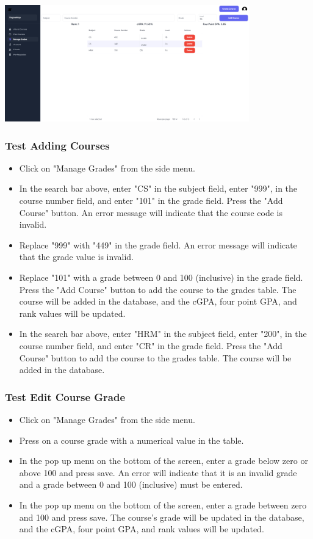 \documentclass[12pt, a4paper]{article}
\begin{document}
\begin{center}
    \includegraphics[width=400px]{R10/i5}
\end{center}

\subsubsection*{Test Adding Courses}
\begin{itemize}
\item Click on "Manage Grades" from the side menu.
\item In the search bar above, enter "CS" in the subject field, enter "999", in the course number field, and enter "101" in the grade field. Press the "Add Course" button. An error message will indicate that the course code is invalid. 
\item Replace "999" with "449" in the grade field. An error message will indicate that the grade value is invalid. 
\item Replace "101" with a grade between 0 and 100 (inclusive) in the grade field. Press the "Add Course" button to add the course to the grades table. The course will be added in the database, and the cGPA, four point GPA, and rank values will be updated.
\item In the search bar above, enter "HRM" in the subject field, enter "200", in the course number field, and enter "CR" in the grade field. Press the "Add Course" button to add the course to the grades table. The course will be added in the database.
\end{itemize}

\subsubsection*{Test Edit Course Grade}
\begin{itemize}
    \item Click on "Manage Grades" from the side menu.
    \item Press on a course grade with a numerical value in the table.
    \item In the pop up menu on the bottom of the screen, enter a grade below zero or above 100 and press save. An error will indicate that it is an invalid grade and a grade between 0 and 100 (inclusive) must be entered.
    \item In the pop up menu on the bottom of the screen, enter a grade between zero and 100 and press save. The course's grade will be updated in the database, and the cGPA, four point GPA, and rank values will be updated.
\end{itemize}
\end{document}
